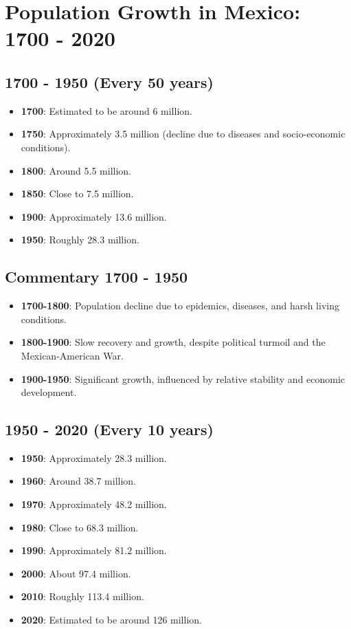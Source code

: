 \section{Population Growth in Mexico: 1700 - 2020}

\subsection*{1700 - 1950 (Every 50 years)}
\begin{itemize}
    \item \textbf{1700}: Estimated to be around 6 million.
    \item \textbf{1750}: Approximately 3.5 million (decline due to diseases and socio-economic conditions).
    \item \textbf{1800}: Around 5.5 million.
    \item \textbf{1850}: Close to 7.5 million.
    \item \textbf{1900}: Approximately 13.6 million.
    \item \textbf{1950}: Roughly 28.3 million.
\end{itemize}

\subsection*{Commentary 1700 - 1950}
\begin{itemize}
    \item \textbf{1700-1800}: Population decline due to epidemics, diseases, and harsh living conditions.
    \item \textbf{1800-1900}: Slow recovery and growth, despite political turmoil and the Mexican-American War.
    \item \textbf{1900-1950}: Significant growth, influenced by relative stability and economic development.
\end{itemize}

\subsection*{1950 - 2020 (Every 10 years)}
\begin{itemize}
    \item \textbf{1950}: Approximately 28.3 million.
    \item \textbf{1960}: Around 38.7 million.
    \item \textbf{1970}: Approximately 48.2 million.
    \item \textbf{1980}: Close to 68.3 million.
    \item \textbf{1990}: Approximately 81.2 million.
    \item \textbf{2000}: About 97.4 million.
    \item \textbf{2010}: Roughly 113.4 million.
    \item \textbf{2020}: Estimated to be around 126 million.
\end{itemize}

